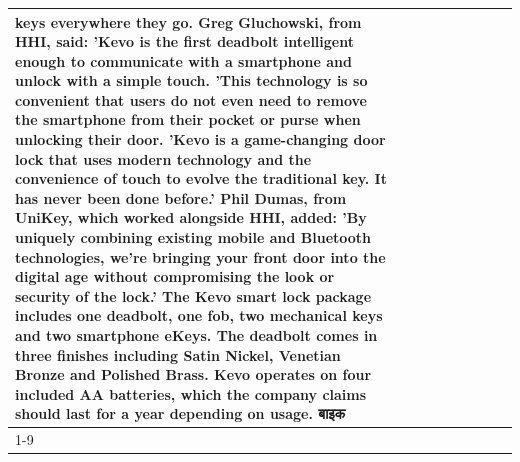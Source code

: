 \begin{table}[H]
\begin{tabular}{lllrlllll}
keys everywhere they go. Greg Gluchowski, from HHI, said: 'Kevo is the first deadbolt intelligent enough to communicate with a smartphone and unlock with a simple touch. 'This technology is so convenient that users do not even need to remove the smartphone from their pocket or purse when unlocking their door. 'Kevo is a game-changing door lock that uses modern technology and the convenience of touch to evolve the traditional key. It has never been done before.' Phil Dumas, from UniKey, which worked alongside HHI, added: 'By uniquely combining existing mobile and Bluetooth technologies, we’re bringing your front door into the digital age without compromising the look or security of the lock.' The Kevo smart lock package includes one deadbolt, one fob, two mechanical keys and two smartphone eKeys. The deadbolt comes in three finishes including Satin Nickel, Venetian Bronze and Polished Brass. Kevo operates on four included AA batteries, which the company claims should last for a year depending on usage. बाइक \\
\cline{1-9}

\end{tabular}
\end{table}
